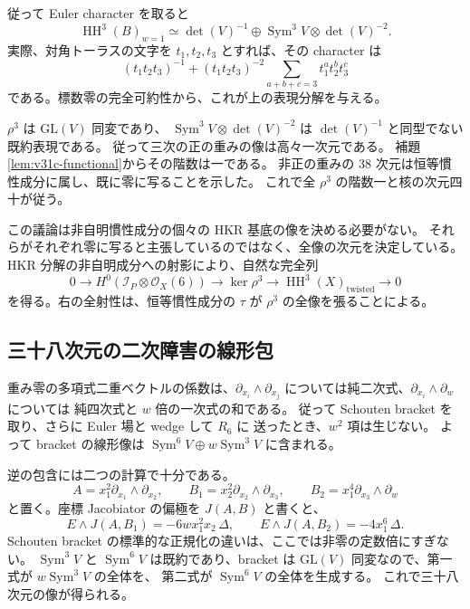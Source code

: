 従って Euler character を取ると
\begin{equation}\label{eq:v31c-positive-representation}
 \operatorname{HH}^3(B)_{w=1}
 \simeq \det(V)^{-1}
 \oplus\operatorname{Sym}^3V\otimes\det(V)^{-2}.
\end{equation}
実際、対角トーラスの文字を $t_1,t_2,t_3$ とすれば、その character は
\[
 (t_1t_2t_3)^{-1}
 +(t_1t_2t_3)^{-2}\sum_{a+b+c=3}t_1^at_2^bt_3^c
\]
である。標数零の完全可約性から、これが上の表現分解を与える。

$\rho^3$ は $\mathrm{GL}(V)$ 同変であり、
$\operatorname{Sym}^3V\otimes\det(V)^{-2}$ は
$\det(V)^{-1}$ と同型でない既約表現である。
従って三次の正の重みの像は高々一次元である。
補題\ref{lem:v31c-functional}からその階数は一である。
非正の重みの $38$ 次元は恒等慣性成分に属し、既に零に写ることを示した。
これで全 $\rho^3$ の階数一と核の次元四十が従う。

この議論は非自明慣性成分の個々の HKR 基底の像を決める必要がない。
それらがそれぞれ零に写ると主張しているのではなく、全像の次元を決定している。
HKR 分解の非自明成分への射影により、自然な完全列
\[
 0\longrightarrow H^0(\mathcal I_P\otimes\mathcal O_X(6))
 \longrightarrow\ker\rho^3
 \longrightarrow\operatorname{HH}^3(X)_{\mathrm{twisted}}
 \longrightarrow0
\]
を得る。右の全射性は、恒等慣性成分の $\tau$ が $\rho^3$ の全像を張ることによる。

\subsection{三十八次元の二次障害の線形包}

重み零の多項式二重ベクトルの係数は、$\partial_{x_i}\wedge\partial_{x_j}$
については純二次式、$\partial_{x_i}\wedge\partial_w$ については
純四次式と $w$ 倍の一次式の和である。
従って Schouten bracket を取り、さらに Euler 場と wedge して $R_6$ に
送ったとき、$w^2$ 項は生じない。
よって bracket の線形像は
$\operatorname{Sym}^6V\oplus w\operatorname{Sym}^3V$ に含まれる。

逆の包含には二つの計算で十分である。
\[
 A=x_1^2\partial_{x_1}\wedge\partial_{x_2},\qquad
 B_1=x_2^2\partial_{x_2}\wedge\partial_{x_3},\qquad
 B_2=x_1^4\partial_{x_3}\wedge\partial_w
\]
と置く。座標 Jacobiator の偏極を $J(A,B)$ と書くと、
\[
 E\wedge J(A,B_1)=-6wx_1^2x_2\,\Delta,\qquad
 E\wedge J(A,B_2)=-4x_1^6\,\Delta.
\]
Schouten bracket の標準的な正規化の違いは、ここでは非零の定数倍にすぎない。
$\operatorname{Sym}^3V$ と $\operatorname{Sym}^6V$ は既約であり、bracket は
$\mathrm{GL}(V)$ 同変なので、第一式が $w\operatorname{Sym}^3V$ の全体を、
第二式が $\operatorname{Sym}^6V$ の全体を生成する。
これで三十八次元の像が得られる。

